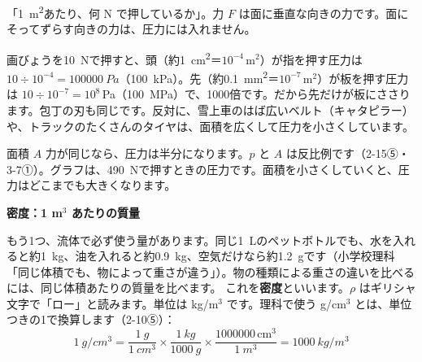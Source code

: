 \begin{phyomi}[$p=F/A$]
「\qty{1}{m^2}あたり、何 N で押しているか」。力 $F$ は面に垂直な向きの力です。面にそってずらす向きの力は、圧力には入れません。
\end{phyomi}
\begin{phmijika}
画びょうを\qty{10}{N}で押すと、頭（約\qty{1}{cm^2}＝$10^{-4}$\,m$^2$）が指を押す圧力は $10\div10^{-4}=\qty{100000}{Pa}$（\qty{100}{kPa}）。先（約\qty{0.1}{mm^2}＝$10^{-7}$\,m$^2$）が板を押す圧力は $10\div10^{-7}=10^8$\,Pa（\qty{100}{MPa}）で、1000倍です。だから先だけが板にささります。包丁の刃も同じです。反対に、雪上車のはば広いベルト（キャタピラー）や、トラックのたくさんのタイヤは、面積を広くして圧力を小さくしています。
\end{phmijika}
\begin{phbaisuru}{面積 $A$}
力が同じなら、圧力は半分になります。$p$ と $A$ は反比例です（2-15⑤・3-7①）。グラフは、\qty{490}{N}で押すときの圧力です。面積を小さくしていくと、圧力はどこまでも大きくなります。
\par\vspace{2pt}\centering
{}
\end{phbaisuru}

\noindent\textbf{密度：1 m$^3$ あたりの質量}\par\nobreak
もう1つ、流体で必ず使う量があります。同じ\qty{1}{L}のペットボトルでも、水を入れると約\qty{1}{kg}、油を入れると約\qty{0.9}{kg}、空気だけなら約\qty{1.2}{g}です（小学校理科「同じ体積でも、物によって重さが違う」）。物の種類による重さの違いを比べるには、同じ体積あたりの質量を比べます。
\label{ph:力-12:mitsudo}
これを\textbf{密度}といいます。$\rho$ はギリシャ文字で「ロー」と読みます。単位は kg/m$^3$ です。理科で使う g/cm$^3$ とは、単位つきの1で換算します（2-10⑤）：
\[ \qty{1}{g/cm^3}=\frac{\qty{1}{g}}{\qty{1}{cm^3}}\times\frac{\qty{1}{kg}}{\qty{1000}{g}}\times\frac{\num{1000000}\,\mathrm{cm^3}}{\qty{1}{m^3}}=\qty{1000}{kg/m^3} \]

